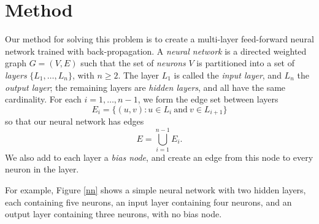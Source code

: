 \documentclass[11pt]{article}
\begin{document}
\section{Method}

Our method for solving this problem is to create a multi-layer feed-forward neural network trained with back-propagation. A \emph{neural network} is a directed weighted graph $G=(V,E)$ such that the set of \emph{neurons} $V$ is partitioned into a set of \emph{layers} $\{L_1,\dots,L_n\}$, with $n\geq 2$. The layer $L_1$ is called the \emph{input layer}, and $L_n$ the \emph{output layer}; the remaining layers are \emph{hidden layers}, and all have the same cardinality. For each $i=1,\dots,n-1$, we form the edge set between layers
\[E_i=\{(u,v) : u\in L_i\mathrm{\ and\ } v\in L_{i+1}\}\]
so that our neural network has edges
\begin{equation}E=\bigcup_{i=1}^{n-1} E_i.\end{equation}
We also add to each layer a \emph{bias node}, and create an edge from this node to every neuron in the layer.

For example, Figure \ref{nn} shows a simple neural network with two hidden layers, each containing five neurons, an input layer containing four neurons, and an output layer containing three neurons, with no bias node.

\def\layersep{2.5cm}
\end{document}
